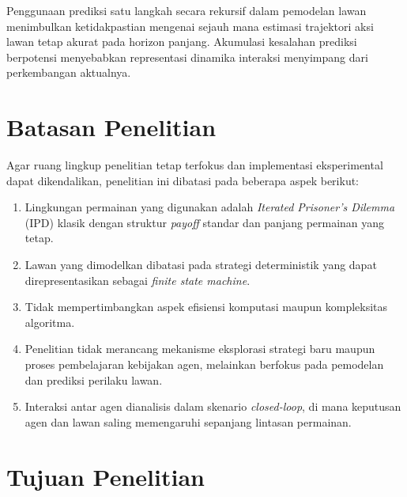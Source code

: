 
Penggunaan prediksi satu langkah secara rekursif dalam pemodelan lawan menimbulkan ketidakpastian mengenai sejauh mana estimasi trajektori aksi lawan tetap akurat pada horizon panjang. Akumulasi kesalahan prediksi berpotensi menyebabkan representasi dinamika interaksi menyimpang dari perkembangan aktualnya.

\section{Batasan Penelitian}

Agar ruang lingkup penelitian tetap terfokus dan implementasi eksperimental dapat dikendalikan, penelitian ini dibatasi pada beberapa aspek berikut:

\begin{enumerate}

\item Lingkungan permainan yang digunakan adalah \textit{Iterated Prisoner's Dilemma} (IPD) klasik dengan struktur \textit{payoff} standar dan panjang permainan yang tetap.

\item Lawan yang dimodelkan dibatasi pada strategi deterministik yang dapat direpresentasikan sebagai \textit{finite state machine}.

\item Tidak mempertimbangkan aspek efisiensi komputasi maupun kompleksitas algoritma. 

\item Penelitian tidak merancang mekanisme eksplorasi strategi baru maupun proses pembelajaran kebijakan agen, melainkan berfokus pada pemodelan dan prediksi perilaku lawan.

\item Interaksi antar agen dianalisis dalam skenario \textit{closed-loop}, di mana keputusan agen dan lawan saling memengaruhi sepanjang lintasan permainan.

\end{enumerate}


\section{Tujuan Penelitian}

